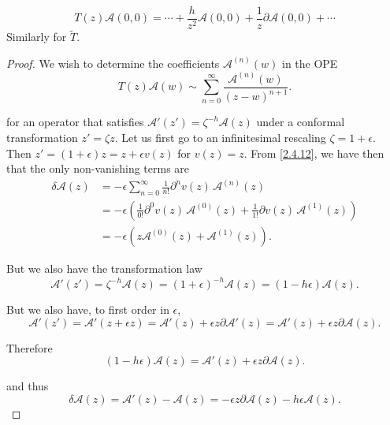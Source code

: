 \begin{equation}\label{2.4.14}
	T(z) \mathscr{A}(0,0)=\cdots+\frac{h}{z^{2}} \mathscr{A}(0,0)+\frac{1}{z} \partial \mathscr{A}(0,0)+\cdots
\end{equation}
Similarly for $\tilde{T}$.    
\begin{tcolorbox}[breakable]
	\begin{proof}
		We wish to determine the coefficients $\mathscr{A}^{(n)}(w)$ in the OPE
		\begin{equation}
			T(z)\mathscr{A}(w) \sim \sum_{n=0}^{\infty} \frac{\mathscr{A}^{(n)}(w)}{(z-w)^{n+1}} .
		\end{equation}
		
		for an operator that satisfies $\mathscr{A}'(z')=\zeta^{-h}\mathscr{A}(z)$ under a conformal transformation $z'=\zeta z$.
		Let us first go to an infinitesimal rescaling $\zeta=1+\epsilon$. Then $z'=(1+\epsilon)z=z+\epsilon v(z)$ for $v(z)=z$. From \eqref{2.4.12}, we have then that the only non-vanishing terms are
		\begin{align}
			\delta \mathscr{A}(z) &= -\epsilon \sum_{n=0}^{\infty} \frac{1}{n!}\partial^n v(z)\, \mathscr{A}^{(n)}(z) \\
			&= -\epsilon \left( \frac{1}{0!}\partial^0 v(z)\,\mathscr{A}^{(0)}(z) + \frac{1}{1!}\partial v(z)\,\mathscr{A}^{(1)}(z) \right) \\
			&= -\epsilon \left( z\mathscr{A}^{(0)}(z) + \mathscr{A}^{(1)}(z) \right) .
		\end{align}
		
		But we also have the transformation law
		\begin{equation}
			\mathscr{A}'(z') = \zeta^{-h} \mathscr{A}(z) = (1+\epsilon)^{-h} \mathscr{A}(z) = (1-h\epsilon)\mathscr{A}(z) .
		\end{equation}
		
		But we also have, to first order in $\epsilon$,
		\begin{equation}
			\mathscr{A}'(z') = \mathscr{A}'(z+\epsilon z) = \mathscr{A}'(z) + \epsilon z \partial \mathscr{A}'(z) = \mathscr{A}'(z) + \epsilon z \partial \mathscr{A}(z) .
		\end{equation}
		
		Therefore
		\begin{equation}
			(1-h\epsilon)\mathscr{A}(z) = \mathscr{A}'(z) + \epsilon z \partial \mathscr{A}(z) .
		\end{equation}
		
		and thus
		\begin{equation}
			\delta \mathscr{A}(z) = \mathscr{A}'(z) - \mathscr{A}(z) = -\epsilon z \partial \mathscr{A}(z) - h\epsilon \mathscr{A}(z) .
		\end{equation}
		

\end{proof}
\end{tcolorbox}
